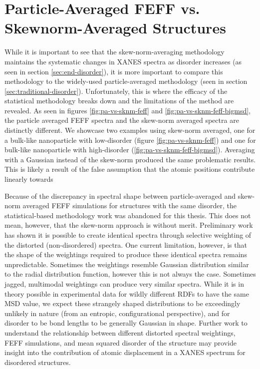 \section{Particle-Averaged FEFF vs. Skewnorm-Averaged Structures} \label{sec:pa-feff-vs-gaussian-feff}

While it is important to see that the skew-norm-averaging methodology maintains the systematic changes in XANES spectra as disorder increases (as seen in section \ref{sec:end-disorder}), it is more important to compare this methodology to the widely-used particle-averaged methodology (seen in section \ref{sec:traditional-disorder}). Unfortunately, this is where the efficacy of the statistical methodology breaks down and the limitations of the method are revealed. As seen in figures \ref{fig:pa-vs-sknm-feff} and \ref{fig:pa-vs-sknm-feff-bigmsd}, the particle averaged FEFF spectra and the skew-norm averaged spectra are distinctly different. We showcase two examples using skew-norm averaged, one for a bulk-like nanoparticle with low-disorder (figure \ref{fig:pa-vs-sknm-feff}) and one for bulk-like nanoparticle with high-disorder (\ref{fig:pa-vs-sknm-feff-bigmsd}). Averaging with a Gaussian instead of the skew-norm produced the same problematic results. This is likely a result of the false assumption that the atomic positions contribute linearly towards  

Because of the discrepancy in spectral shape between particle-averaged and skew-norm averaged FEFF simulations for structures with the same disorder, the statistical-based methodology work was abandoned for this thesis. This does not mean, however, that the skew-norm approach is without merit. Preliminary work has shown it is possible to create identical spectra through selective weighting of the distorted (non-disordered) spectra. One current limitation, however, is that the shape of the weightings required to produce these identical spectra remains unpredictable. Sometimes the weightings resemble Gaussian distribution similar to the radial distribution function, however this is not always the case. Sometimes jagged, multimodal weightings can produce very similar spectra. While it is in theory possible in experimental data for wildly different RDFs to have the same MSD value, we expect these strangely shaped distributions to be exceedingly unlikely in nature (from an entropic, configurational perspective), and for disorder to be bond lengths to be generally Gaussian in shape. Further work to understand the relationship between different distorted spectral weightings, FEFF simulations, and mean squared disorder of the structure may provide insight into the contribution of atomic displacement in a XANES spectrum for disordered structures.

